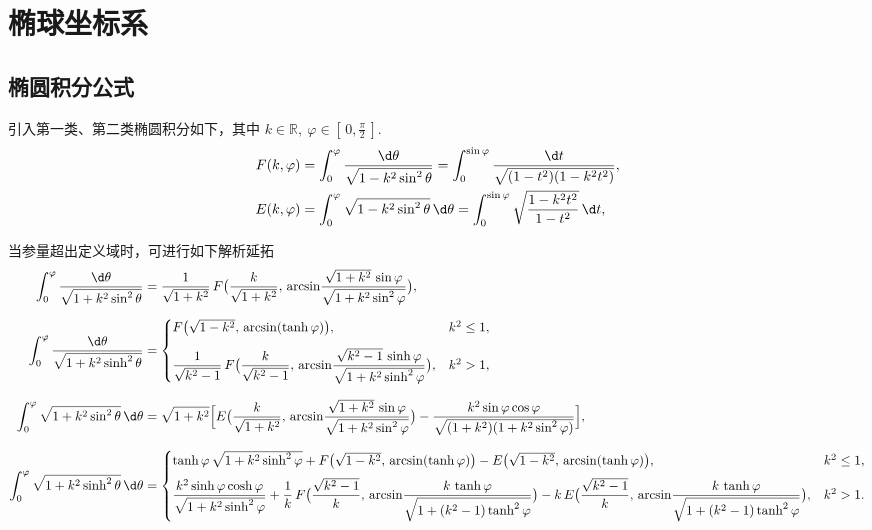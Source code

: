\section{椭球坐标系}
\label{椭球坐标系小节}

\subsection{椭圆积分公式}
引入第一类、第二类椭圆积分如下，其中 \(k\in\mathbb{R},\ \varphi\in[\,0,\tfrac\pi2\,]\).
\begin{align*}
	F(k,\varphi)
	 & =\int_{0}^{\varphi}\frac{\d \theta}{\sqrt{1 - k^2\sin^2\theta}}
	=\int_{0}^{\sin\varphi}\frac{\d t}{\sqrt{(1 - t^2)(1 - k^2t^2)}},  \\
	E(k,\varphi)
	 & =\int_{0}^{\varphi}\sqrt{1 - k^2\sin^2\theta}\,\d \theta
	=\int_{0}^{\sin\varphi}\sqrt{\frac{1 - k^2t^2}{1 - t^2}}\,\d t,
\end{align*}

当参量超出定义域时，可进行如下解析延拓
\small
\begin{align*}
	\int_{0}^{\varphi}\dfrac{\d \theta}{\sqrt{1 + k^2\sin^2\theta}}
	 & =\dfrac{1}{\sqrt{1+k^2}}\,
	F\bigl(\dfrac{k}{\sqrt{1+k^2}},\,
	\arcsin\!\dfrac{\sqrt{1+k^2}\,\sin\varphi}{\sqrt{1+k^2\sin^2\varphi}}\bigr),                                                       \\[6pt]
	\int_{0}^{\varphi}\dfrac{\d \theta}{\sqrt{1 + k^2\sinh^2\theta}}
	 & =
	\begin{cases}
		F\bigl(\sqrt{1-k^2},\,\arcsin(\tanh\varphi)\bigr),                             & k^2\le1, \\[2ex]
		\dfrac{1}{\sqrt{k^2-1}}\,
		F\bigl(\dfrac{k}{\sqrt{k^2-1}},\,
		\arcsin\!\dfrac{\sqrt{k^2-1}\,\sinh\varphi}{\sqrt{1+k^2\sinh^2\varphi}}\bigr), & k^2>1,
	\end{cases} \\[8pt]
	\int_{0}^{\varphi}\sqrt{1 + k^2\sin^2\theta}\,\d \theta
	 & =\sqrt{1+k^2}\Bigl[
		E\bigl(\dfrac{k}{\sqrt{1+k^2}},\,
		\arcsin\!\dfrac{\sqrt{1+k^2}\,\sin\varphi}{\sqrt{1+k^2\sin^2\varphi}}\bigr)
	-\dfrac{k^2\sin\varphi\cos\varphi}{\sqrt{(1+k^2)(1+k^2\sin^2\varphi)}}\Bigr],                                                      \\[8pt]
	\int_{0}^{\varphi}\sqrt{1 + k^2\sinh^2\theta}\,\d \theta
	 & =
	\begin{cases}
		\tanh\varphi\,\sqrt{1+k^2\sinh^2\varphi}
		+F\bigl(\sqrt{1-k^2},\,\arcsin(\tanh\varphi)\bigr)
		-E\bigl(\sqrt{1-k^2},\,\arcsin(\tanh\varphi)\bigr),              & k^2\le1, \\[6pt]
		\dfrac{k^2\sinh\varphi\cosh\varphi}{\sqrt{1+k^2\sinh^2\varphi}}
		+\dfrac{1}{k}\,
		F\bigl(\dfrac{\sqrt{k^2-1}}{k},\,
		\arcsin\!\dfrac{k\,\tanh\varphi}{\sqrt{1+(k^2-1)\tanh^2\varphi}}\bigr)
		-k\,
		E\bigl(\dfrac{\sqrt{k^2-1}}{k},\,
		\arcsin\!\dfrac{k\,\tanh\varphi}{\sqrt{1+(k^2-1)\tanh^2\varphi}}\bigr), & k^2>1.
	\end{cases}
\end{align*}


